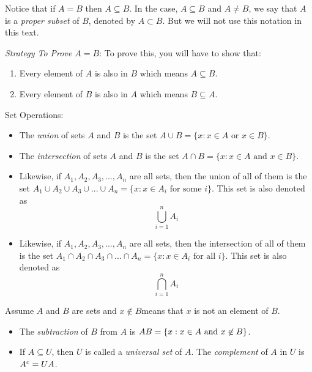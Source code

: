 Notice that if $A = B$ then $A \subseteq B$. In the case, $A \subseteq B$ and $A \neq B$, we say that $A$ is a \emph{proper subset} of $B$, denoted by $A \subset B$. But we will not use this notation in this text.

\break
\emph{Strategy To Prove $A = B$}: To prove this, you will have to show that:
\begin{enumerate}
	\item Every element of $A$ is also in $B$ which means $A \subseteq B$.
	\item Every element of $B$ is also in $A$ which means $B \subseteq A$.
\end{enumerate}

\begin{definition}
	Set Operations:
	\begin{itemize}
		\item The \emph{union} of sets $A$ and $B$ is the set $A \cup B = \{ x : x \in A \text{ or } x \in B \}$.

		\item The \emph{intersection} of sets $A$ and $B$ is the set $A \cap B = \{ x : x \in A \text{ and } x \in B \}$.

		\item Likewise, if $A_1, A_2, A_3, ..., A_n$ are all sets, then the union of all of them is the set 
			$A_1 \cup A_2 \cup A_3 \cup ... \cup A_n = \{ x : x \in A_i \text{ for some } i \}$. 
			This set is also denoted as $$\bigcup_{i=1}^{n} A_i$$

		\item Likewise, if $A_1, A_2, A_3, ..., A_n$ are all sets, then the intersection of all of them is the set 
			$A_1 \cap A_2 \cap A_3 \cap ... \cap A_n = \{ x : x \in A_i \text{ for all } i \}$. 
			This set is also denoted as $$\bigcap_{i=1}^{n} A_i$$
	\end{itemize}
\end{definition}

\begin{definition}\label{subtract}\label{complement}
Assume $A$ and $B$ are sets and $x \not\in B$means that $x$ is not an element of $B$.
\begin{itemize}
	\item The \emph{subtraction} of $B$ from $A$ is $A \\ B = \{ x : x \in A \text{ and } x \not\in B \}$.
	\item If $A \subseteq U$, then $U$ is called a \emph{universal set} of $A$. The \emph{complement} of $A$ in $U$ is $A^c = U \\ A$.
\end{itemize}
\end{definition}

